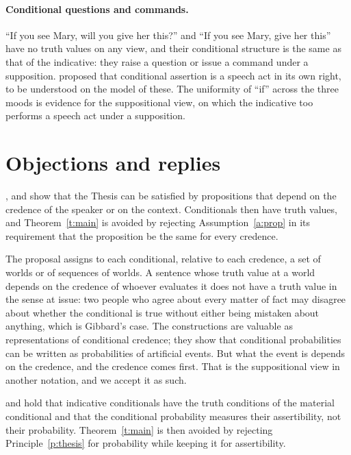 \documentclass{situationist-preprint}
\begin{document}
\paragraph{Conditional questions and commands.} \enquote{If you see Mary, will you give her this?} and \enquote{If you see Mary, give her this} have no truth values on any view, and their conditional structure is the same as that of the indicative: they raise a question or issue a command under a supposition. \citet{Belnap1970} proposed that conditional assertion is a speech act in its own right, to be understood on the model of these. The uniformity of \enquote{if} across the three moods is evidence for the suppositional view, on which the indicative too performs a speech act under a supposition.

\section{Objections and replies}\label{s:obj}

\begin{objection}\label{o:vf}
\citet{vanFraassen1976}, \citet{McGee1989} and \citet{Bacon2015} show that the Thesis can be satisfied by propositions that depend on the credence of the speaker or on the context. Conditionals then have truth values, and Theorem~\ref{t:main} is avoided by rejecting Assumption~\ref{a:prop} in its requirement that the proposition be the same for every credence.
\end{objection}

\begin{reply}
The proposal assigns to each conditional, relative to each credence, a set of worlds or of sequences of worlds. A sentence whose truth value at a world depends on the credence of whoever evaluates it does not have a truth value in the sense at issue: two people who agree about every matter of fact may disagree about whether the conditional is true without either being mistaken about anything, which is Gibbard's case. The constructions are valuable as representations of conditional credence; they show that conditional probabilities can be written as probabilities of artificial events. But what the event is depends on the credence, and the credence comes first. That is the suppositional view in another notation, and we accept it as such.
\end{reply}

\begin{objection}\label{o:jack}
\citet{Jackson1979,Jackson1987} and \citet{Lewis1976} hold that indicative conditionals have the truth conditions of the material conditional and that the conditional probability measures their assertibility, not their probability. Theorem~\ref{t:main} is then avoided by rejecting Principle~\ref{p:thesis} for probability while keeping it for assertibility.
\end{objection}
\end{document}
